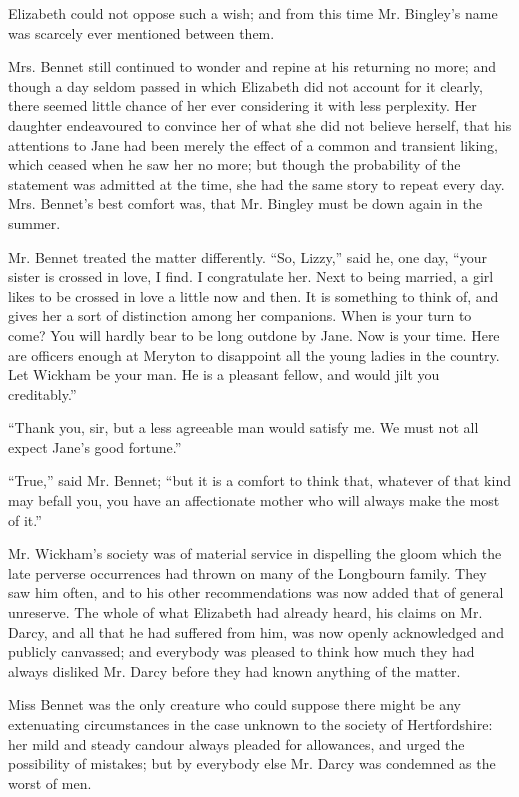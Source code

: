 \documentclass[12pt,openright]{book}
\begin{document}
Elizabeth could not oppose such a wish; and from this time Mr. Bingley’s name was scarcely ever mentioned between them.

Mrs. Bennet still continued to wonder and repine at his returning no more; and though a day seldom passed in which Elizabeth did not account for it clearly, there seemed little chance of her ever considering it with less perplexity. Her daughter endeavoured to convince her of what she did not believe herself, that his attentions to Jane had been merely the effect of a common and transient liking, which ceased when he saw her no more; but though the probability of the statement was admitted at the time, she had the same story to repeat every day. Mrs. Bennet’s best comfort was, that Mr. Bingley must be down again in the summer.

Mr. Bennet treated the matter differently. “So, Lizzy,” said he, one day, “your sister is crossed in love, I find. I congratulate her. Next to being married, a girl likes to be crossed in love a little now and then. It is something to think of, and gives her a sort of distinction among her companions. When is your turn to come? You will hardly bear to be long outdone by Jane. Now is your time. Here are officers enough at Meryton to disappoint all the young ladies in the country. Let Wickham be your man. He is a pleasant fellow, and would jilt you creditably.”

“Thank you, sir, but a less agreeable man would satisfy me. We must not all expect Jane’s good fortune.”

“True,” said Mr. Bennet; “but it is a comfort to think that, whatever of that kind may befall you, you have an affectionate mother who will always make the most of it.”

Mr. Wickham’s society was of material service in dispelling the gloom which the late perverse occurrences had thrown on many of the Longbourn family. They saw him often, and to his other recommendations was now added that of general unreserve. The whole of what Elizabeth had already heard, his claims on Mr. Darcy, and all that he had suffered from him, was now openly acknowledged and publicly canvassed; and everybody was pleased to think how much they had always disliked Mr. Darcy before they had known anything of the matter.

Miss Bennet was the only creature who could suppose there might be any extenuating circumstances in the case unknown to the society of Hertfordshire: her mild and steady candour always pleaded for allowances, and urged the possibility of mistakes; but by everybody else Mr. Darcy was condemned as the worst of men.
\end{document}

